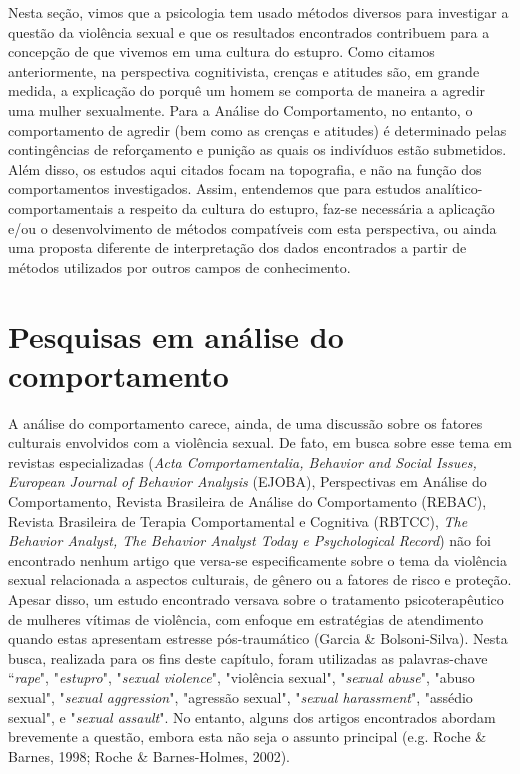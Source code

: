 Nesta seção, vimos que a psicologia tem usado métodos diversos para investigar a questão da violência sexual e que os resultados encontrados contribuem para a concepção de que vivemos em uma cultura do estupro. Como citamos anteriormente, na perspectiva cognitivista, crenças e atitudes são, em grande medida, a explicação do porquê um homem se comporta de maneira a agredir uma mulher sexualmente. Para a Análise do Comportamento, no entanto, o comportamento de agredir (bem como as crenças e atitudes) é determinado pelas contingências de reforçamento e punição as quais os indivíduos estão submetidos. Além disso, os estudos aqui citados focam na topografia, e não na função dos comportamentos investigados. Assim, entendemos que para estudos analítico-comportamentais a respeito da cultura do estupro, faz-se necessária a aplicação e/ou o desenvolvimento de métodos compatíveis com esta perspectiva, ou ainda uma proposta diferente de interpretação dos dados encontrados a partir de métodos utilizados por outros campos de conhecimento.

\section{Pesquisas em análise do comportamento}

A análise do comportamento carece, ainda, de uma discussão sobre os fatores culturais envolvidos com a violência sexual. De fato, em busca sobre esse tema em revistas especializadas (\textit{Acta Comportamentalia, Behavior and Social Issues, European Journal of Behavior Analysis} (EJOBA), Perspectivas em Análise do Comportamento, Revista Brasileira de Análise do Comportamento (REBAC), Revista Brasileira de Terapia Comportamental e Cognitiva (RBTCC), \textit{The Behavior Analyst, The Behavior Analyst Today e Psychological Record}) não foi encontrado nenhum artigo que versa-se especificamente sobre o tema da violência sexual relacionada a aspectos culturais, de gênero ou a fatores de risco e proteção. Apesar disso, um estudo encontrado versava sobre o tratamento psicoterapêutico de mulheres vítimas de violência, com enfoque em estratégias de atendimento quando estas apresentam estresse pós-traumático (Garcia \& Bolsoni-Silva). Nesta busca, realizada para os fins deste capítulo, foram utilizadas as palavras-chave ``\textit{rape}", "\textit{estupro}", "\textit{sexual violence}", "violência sexual", "\textit{sexual abuse}", "abuso sexual", "\textit{sexual aggression}", "agressão sexual", "\textit{sexual harassment}", "assédio sexual", e "\textit{sexual assault}". No entanto, alguns dos artigos encontrados abordam brevemente a questão, embora esta não seja o assunto principal (e.g. Roche \& Barnes, 1998; Roche \& Barnes-Holmes, 2002).

